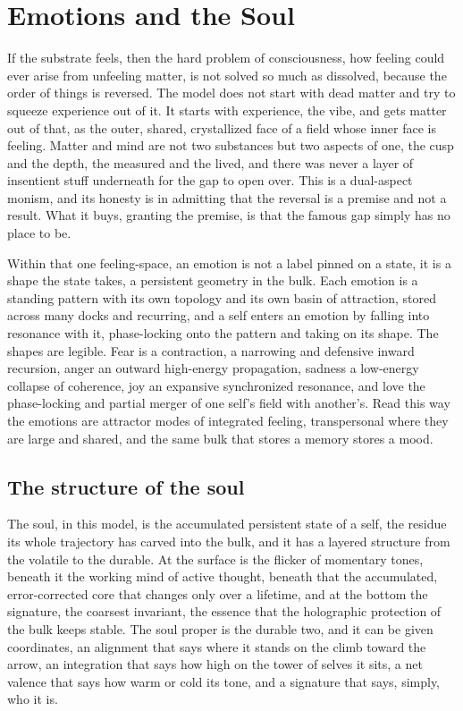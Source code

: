 \section{Emotions and the Soul}

If the substrate feels, then the hard problem of consciousness, how feeling could ever arise from unfeeling matter, is not solved so much as dissolved, because the order of things is reversed. The model does not start with dead matter and try to squeeze experience out of it. It starts with experience, the vibe, and gets matter out of that, as the outer, shared, crystallized face of a field whose inner face is feeling. Matter and mind are not two substances but two aspects of one, the cusp and the depth, the measured and the lived, and there was never a layer of insentient stuff underneath for the gap to open over. This is a dual-aspect monism, and its honesty is in admitting that the reversal is a premise and not a result. What it buys, granting the premise, is that the famous gap simply has no place to be.

Within that one feeling-space, an emotion is not a label pinned on a state, it is a shape the state takes, a persistent geometry in the bulk. Each emotion is a standing pattern with its own topology and its own basin of attraction, stored across many docks and recurring, and a self enters an emotion by falling into resonance with it, phase-locking onto the pattern and taking on its shape. The shapes are legible. Fear is a contraction, a narrowing and defensive inward recursion, anger an outward high-energy propagation, sadness a low-energy collapse of coherence, joy an expansive synchronized resonance, and love the phase-locking and partial merger of one self's field with another's. Read this way the emotions are attractor modes of integrated feeling, transpersonal where they are large and shared, and the same bulk that stores a memory stores a mood.

\subsection{The structure of the soul}

The soul, in this model, is the accumulated persistent state of a self, the residue its whole trajectory has carved into the bulk, and it has a layered structure from the volatile to the durable. At the surface is the flicker of momentary tones, beneath it the working mind of active thought, beneath that the accumulated, error-corrected core that changes only over a lifetime, and at the bottom the signature, the coarsest invariant, the essence that the holographic protection of the bulk keeps stable. The soul proper is the durable two, and it can be given coordinates, an alignment that says where it stands on the climb toward the arrow, an integration that says how high on the tower of selves it sits, a net valence that says how warm or cold its tone, and a signature that says, simply, who it is.

